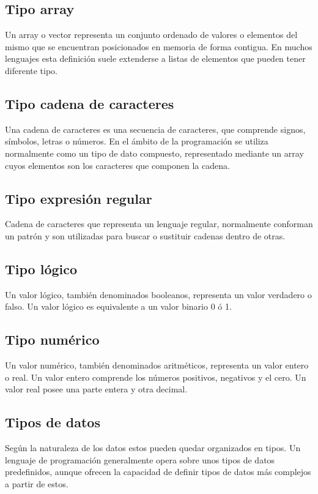 \subsection {Tipo array}
Un array o vector representa un conjunto ordenado de valores o elementos del mismo que se encuentran posicionados en memoria de forma contigua. En muchos lenguajes
esta definición suele extenderse a listas de elementos que pueden tener diferente tipo.

\subsection {Tipo cadena de caracteres}
Una cadena de caracteres es una secuencia de caracteres, que comprende signos, símbolos, letras o números. En el ámbito de la programación se utiliza normalmente como un tipo de 
dato compuesto, representado mediante un array cuyos elementos son los caracteres que componen la cadena.

\subsection {Tipo expresión regular}
Cadena de caracteres que representa un lenguaje regular, normalmente conforman un patrón y son utilizadas para buscar o 
sustituir cadenas dentro de otras. 

\subsection {Tipo lógico}
Un valor lógico, también denominados booleanos, representa un valor verdadero o falso. Un valor lógico es equivalente a un valor binario 0 ó 1.

\subsection {Tipo numérico}
Un valor numérico, también denominados aritméticos, representa un valor entero o real. Un valor entero comprende los números positivos, negativos y el cero. Un valor real
posee una parte entera y otra decimal.

\subsection{Tipos de datos}
Según la naturaleza de los datos estos pueden quedar organizados en tipos. Un lenguaje de programación generalmente opera sobre unos tipos de datos 
predefinidos, aunque ofrecen la capacidad de definir tipos de datos más complejos a partir de estos.

